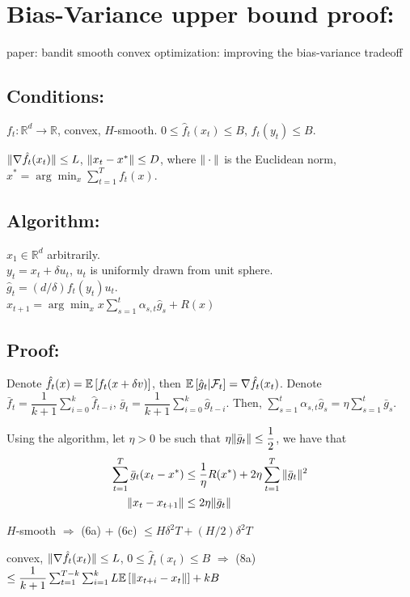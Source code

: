 \documentclass[11pt,letterpaper,english]{article}
\begin{document}
\section*{Bias-Variance upper bound proof:}
paper: bandit smooth convex optimization: improving the bias-variance tradeoff

\subsection*{Conditions: } 

$f_t: \mathbb{R}^d \to \mathbb{R}$, convex, $H$-smooth.
$ 0 \leq \hat{f}_t(x_t) \leq B$, $f_t(y_t)\leq B$.

$\|\nabla \hat{f}_t(x_t)\| \leq L$, $\|x_t - x^*\| \leq D$, where $\|\cdot\|$ is the Euclidean norm, $x^* = \arg \min_x \sum_{t=1}^T f_t(x)$.

\subsection*{Algorithm: }
$x_1 \in \mathbb{R}^d$ arbitrarily.\\
$y_t = x_t + \delta u_t$, $u_t$ is uniformly drawn from unit sphere.\\
$\hat{g}_t = (d/\delta) f_t(y_t) u_t$.\\
$x_{t+1} = \arg \min_x x \sum_{s=1}^t \alpha_{s,t} \hat{g}_s + R(x)$

\subsection*{Proof: }

Denote $\hat{f}_t(x) = \mathbb{E}\left[f_t(x+\delta v)\right]$, then $\mathbb{E}\left[\hat{g}_t| \mathcal{F}_t\right] = \nabla \hat{f}_t(x_t)$.
Denote $\bar{f}_t = \dfrac{1}{k+1} \sum_{i=0}^k \hat{f}_{t-i}$, 
$\bar{g}_t = \dfrac{1}{k+1} \sum_{i=0}^k \hat{g}_{t-i}$. 
Then, $\sum_{s=1}^t \alpha_{s,t} \hat{g}_s = \eta \sum_{s=1}^t \bar{g}_s$.

Using the algorithm, let $\eta>0$ be such that $\eta \|\bar{g}_t\| \leq \dfrac{1}{2}$, we have that
\begin{align*}
\sum_{t=1}^T \bar{g}_t (x_t - x^*) &\leq \dfrac{1}{\eta} R(x^*) + 2\eta \sum_{t=1}^T \|\bar{g}_t\|^2 \\ 
\|x_t-x_{t+1}\| &\leq 2\eta \|\bar{g}_t\|
\end{align*}

$H$-smooth $\Rightarrow$ (6a) + (6c) $\leq H\delta^2T + (H/2)\delta^2T$ 

convex, $\|\nabla \hat{f}_t(x_t)\| \leq L$, $ 0 \leq \hat{f}_t(x_t) \leq B$   $\Rightarrow$
(8a) $\leq \dfrac{1}{k+1} \sum_{t=1}^{T-k}\sum_{i=1}^k L\mathbb{E}\left[\|x_{t+i} -x_t\|\right] + kB$
\end{document}
